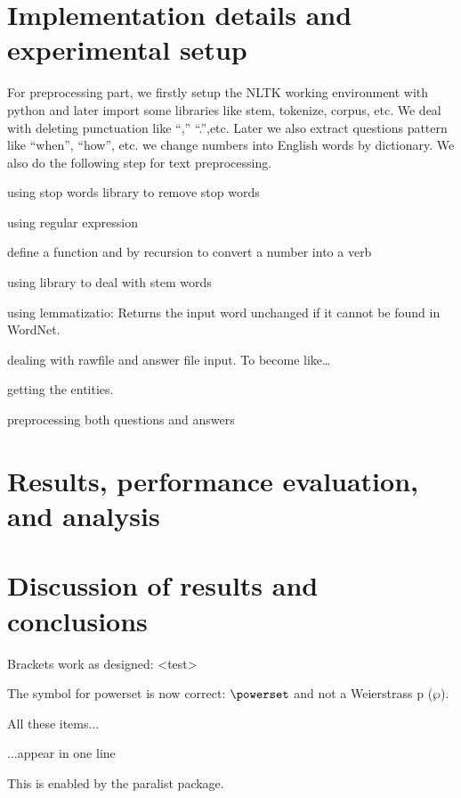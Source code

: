 \documentclass[runningheads,a4paper]{llncs}
\begin{document}
\section{Implementation details and experimental setup}
For preprocessing part, we firstly setup the NLTK working environment with python and later import some libraries like stem, tokenize, corpus, etc. We deal with deleting punctuation like “,” “.”,etc. Later we also extract questions pattern like “when”, “how”, etc. we change numbers into English words by dictionary. We also do the following step for text preprocessing. 


\begin{inparaenum}
	\item using stop words library to remove stop words
	\item using regular expression
	\item define a function and by recursion to convert a number into a verb
	\item using library to deal with stem words
	\item using lemmatizatio: Returns the input word unchanged if it cannot be found in WordNet.
	\item dealing with rawfile and answer file input. To become like…
	\item getting the entities.
	\item preprocessing both questions and answers
\end{inparaenum}


\section{Results, performance evaluation, and analysis}

\section{Discussion of results and conclusions}






Brackets work as designed:
<test>

The symbol for powerset is now correct: $\powerset$ and not a Weierstrass p ($\wp$).

\begin{inparaenum}
\item All these items...
\item ...appear in one line
\item This is enabled by the paralist package.
\end{inparaenum}
\end{document}
